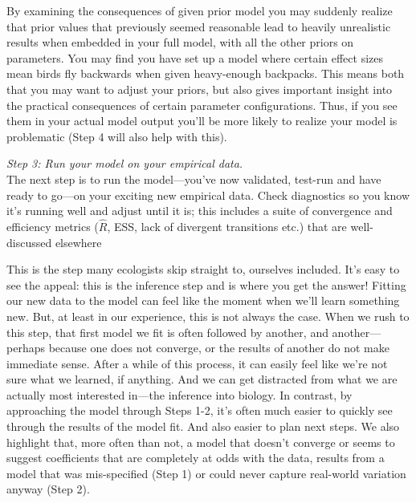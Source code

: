 \documentclass[11pt]{article}
\begin{document}
{By examining the consequences of given prior model you may suddenly realize that prior values that previously seemed reasonable lead to heavily unrealistic results when embedded in your full model, with all the other priors on parameters. You may find you have set up a model where certain effect sizes mean birds fly backwards when given heavy-enough backpacks. This means both that you may want to adjust your priors, but also gives important insight into the practical
consequences of certain parameter configurations. Thus, if you see them in your actual model output you'll be more likely to realize your model is problematic (Step 4 will also help with this).

 \emph{Step 3: Run your model on your empirical data.} \\
The next step is to run the model---you've now validated, test-run and have ready to go---on your exciting new empirical data. Check diagnostics so you know it's running well and adjust until it is; this includes a suite of convergence and efficiency metrics ($\hat{R}$, ESS, lack of divergent transitions etc.) that are well-discussed elsewhere \citep[and not our focus here, see instead][]{betanworkflow,gelman2020bayesian,vandeschoot2021,gabryvis}
 
This is the step many ecologists skip straight to, ourselves included. It's easy to see the appeal: this is the inference step and is where you get the answer! Fitting our new data to the model can feel like the moment when we'll learn something new. But, at least in our experience, this is not always the case. When we rush to this step, that first model we fit is often followed by another, and another---perhaps because one does not converge, or the results of another do not make immediate sense. After a while of this process, it can easily feel like we're not sure what we learned, if anything. And we can get distracted from what we are actually most interested in---the inference into biology. In contrast, by approaching the model through Steps 1-2, it's often much easier to quickly see through the results of the model fit. And also easier to plan next steps. We also highlight that, more often than not, a model that doesn't converge or seems to suggest coefficients that are completely at odds with the data, results from a model that was mis-specified (Step 1) or could never capture real-world variation anyway (Step 2).
 
}
\end{document}
